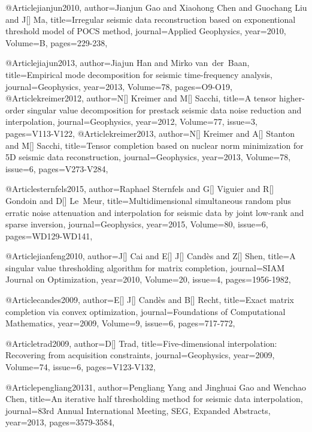 @Article{jianjun2010,
  author={Jianjun Gao and Xiaohong Chen and Guochang Liu and J[] Ma},
  title={Irregular seismic data reconstruction based on exponentional threshold model of {POCS} method},
  journal={Applied Geophysics},
  year=2010,
  Volume=B,
  pages={229-238},
}

@Article{jiajun2013,
  author={Jiajun Han and Mirko van~der~Baan},
  title={Empirical mode decomposition for seismic time-frequency analysis},
  journal={Geophysics},
  year=2013,
  Volume=78,
  pages={O9-O19},
}
@Article{kreimer2012,
  author={N[] Kreimer and M[] Sacchi},
  title={A tensor higher-order singular value decomposition for prestack seismic data noise reduction and interpolation},
  journal={Geophysics},
  year=2012,
  Volume=77,
  issue=3,
  pages={V113-V122},
}
@Article{kreimer2013,
  author={N[] Kreimer and A[] Stanton and M[] Sacchi},
  title={Tensor completion based on nuclear norm minimization for 5{D} seismic data reconstruction},
  journal={Geophysics},
  year=2013,
  Volume=78,
  issue=6,
  pages={V273-V284},
}

@Article{sternfels2015,
  author={Raphael Sternfels and G[] Viguier and R[] Gondoin and D[] Le~Meur},
  title={Multidimensional simultaneous random plus erratic noise attenuation and interpolation for seismic data by joint low-rank and sparse inversion},
  journal={Geophysics},
  year=2015,
  Volume=80,
  issue=6,
  pages={WD129-WD141},
}

@Article{jianfeng2010,
  author={J[] Cai and E[] J[] Cand\`{e}s and Z[] Shen},
  title={A singular value thresholding algorithm for matrix completion},
  journal={SIAM Journal on Optimization},
  year=2010,
  Volume=20,
  issue=4,
  pages={1956-1982},
}

@Article{candes2009,
  author={E[] J[] Cand\`{e}s and B[] Recht},
  title={Exact matrix completion via convex optimization},
  journal={Foundations of Computational Mathematics},
  year=2009,
  Volume=9,
  issue=6,
  pages={717-772},
}

@Article{trad2009,
  author={D[] Trad},
  title={Five-dimensional interpolation: Recovering from acquisition constraints},
  journal={Geophysics},
  year=2009,
  Volume=74,
  issue=6,
  pages={V123-V132},
}

@Article{pengliang20131,
  author={Pengliang Yang and Jinghuai Gao and Wenchao Chen},
  title={An iterative half thresholding method for seismic data interpolation},
  journal={83rd Annual International Meeting, SEG, Expanded Abstracts},
  year=2013,
  pages={3579-3584},
}

